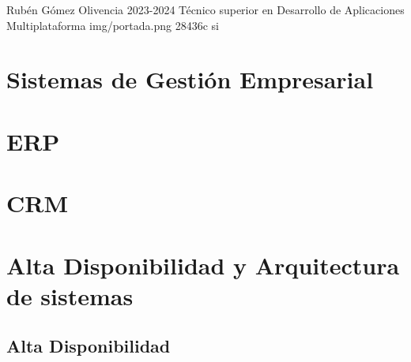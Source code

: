 \documentclass{\ClassPath/yukibook}
\begin{document}
    {Rubén Gómez Olivencia}  %
    {2023-2024}    %
    {Técnico superior en \linebreak Desarrollo de  Aplicaciones Multiplataforma} %
    {}%
    {}%
    {img/portada.png} %
    {28436c}
    {si} %

    \coverpage
    \graphicspath{{../../../yukibook.cls/}}
    \licensepage

    \tableofcontents


    \part{Sistemas de Gestión Empresarial}
    \graphicspath{{./img/sge}}
    


    \part{ERP}
    

    \part{CRM}
    

%    


    \part{Alta Disponibilidad y Arquitectura de sistemas}
    \chapter{Alta Disponibilidad}
    
    \graphicspath{{../../../temas_comunes/arquitectura_sistemas/img/}}
    




\end{document}

